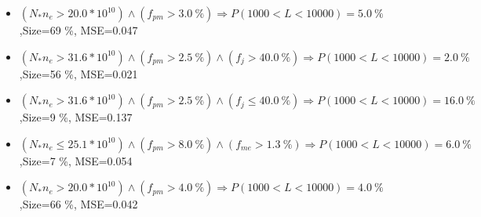 \documentclass[numbered]{CSL}
\begin{document}
\begin{itemize}
\item $(N_* n_e > 20.0 * 10^{10}) \land (f_{pm} > 3.0~\%) \Rightarrow P(1 000 < L < 10 000) = 5.0~\%$,\hfill Size=69 \%, MSE=0.047
\item $(N_* n_e > 31.6 * 10^{10}) \land (f_{pm} > 2.5~\%) \land (f_j > 40.0~\%) \Rightarrow P(1 000 < L < 10 000) = 2.0~\%$,\hfill Size=56 \%, MSE=0.021
\item $(N_* n_e > 31.6 * 10^{10}) \land (f_{pm} > 2.5~\%) \land (f_j \leq 40.0~\%) \Rightarrow P(1 000 < L < 10 000) = 16.0~\%$,\hfill Size=9 \%, MSE=0.137
\item $(N_* n_e \leq 25.1 * 10^{10}) \land (f_{pm} > 8.0~\%) \land (f_{me} > 1.3~\%) \Rightarrow P(1 000 < L < 10 000) = 6.0~\%$,\hfill Size=7 \%, MSE=0.054
\item $(N_* n_e > 20.0 * 10^{10}) \land (f_{pm} > 4.0~\%) \Rightarrow P(1 000 < L < 10 000) = 4.0~\%$,\hfill Size=66 \%, MSE=0.042
\end{itemize}
\end{document}

